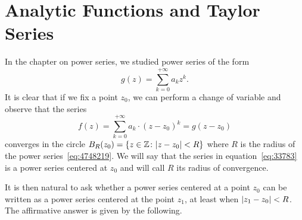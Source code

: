 \section{Analytic Functions and Taylor Series}

In the chapter on power series, we studied power series of the form
\begin{equation}\label{eq:4748219}
    g(z) = \sum_{k=0}^{+\infty} a_k z^k.
\end{equation}
It is clear that if we fix a point $z_0$, we can perform a change of variable
and observe that the series
\begin{equation}\label{eq:33783}
  f(z) = \sum_{k=0}^{+\infty} a_k \cdot(z-z_0)^k = g(z-z_0)
\end{equation}
converges in the circle $B_R(z_0) = {\left\{ z \in {\mathbb Z}\colon {\left|z-z_0\right|}< R \right\}}$
where $R$ is the radius of the power series~\eqref{eq:4748219}. We will say that
the series in equation~\eqref{eq:33783} is a power series centered at $z_0$ and
will call $R$ its radius of convergence.

It is then natural to ask whether a power series centered at a point $z_0$ can
be written as a power series centered at the point $z_1$, at least when
${\left|z_1-z_0\right|}<R$. The affirmative answer is given by the following.

